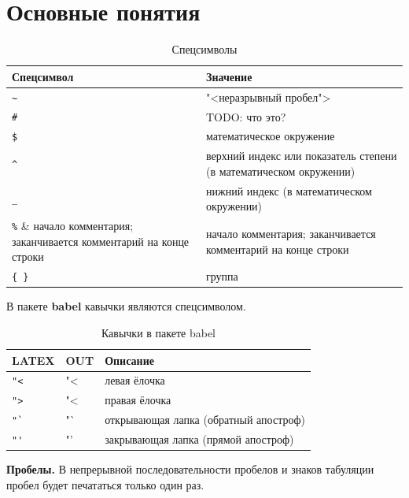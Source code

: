 \section{Основные понятия}

\begin{table}[h!]
    \caption{Спецсимволы}
    \label{specsymbols}
    \begin{tabular}{|l|p{}|}
        \hline
        \textbf{Спецсимвол} &
        \textbf{Значение} \\ \hline

        \verb|~| & "<неразрывный пробел"> \\ \hline
        \verb|#| & TODO: что это? \\ \hline
        \verb|$| & математическое окружение \\ \hline
        \verb|^| & верхний индекс или показатель степени (в математическом окружении) \\ \hline
        \verb|_| & нижний индекс (в математическом окружении) \\ \hline
        \verb|%| & начало комментария; заканчивается комментарий на конце строки \\ \hline
        \verb|{ }| & группа \\ \hline
    \end{tabular}
\end{table}

\bigskip

\noindent
В пакете \textbf{babel} кавычки являются спецсимволом.

\begin{table}[h!]
    \caption{Кавычки в пакете babel}
    \label{quotes_in_babel}
    \begin{tabular}{|l|l|p{}|}
        \hline
        \textbf{LATEX} &
        \textbf{OUT}   &
        \textbf{Описание} \\ \hline
        \verb|"<| & "< & левая ёлочка  \\ \hline
        \verb|">| & "< & правая ёлочка \\ \hline
        \verb|"`| & "` & открывающая лапка (обратный апостроф) \\ \hline
        \verb|"'| & "' & закрывающая лапка (прямой апостроф)   \\ \hline
    \end{tabular}
\end{table}

\textbf{Пробелы.} В непрерывной последовательности пробелов и знаков табуляции пробел будет печататься только один раз.


